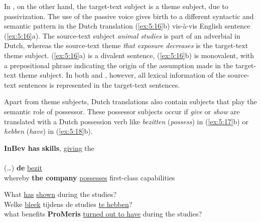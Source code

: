 \documentclass[output=paper]{LSP/langsci}
\begin{document}
In , on the other hand, the target-text subject is a theme subject, due to passivization. The use of the passive voice gives birth to a different syntactic and semantic pattern in the Dutch translation (\ref{ex:5:16}b) vis-à-vis English sentence (\ref{ex:5:16}a). The source-text subject \textit{animal studies} is part of an adverbial in Dutch, whereas the source-text theme \textit{that exposure decreases} is the target-text theme subject. (\ref{ex:5:16}a) is a divalent sentence, (\ref{ex:5:16}b) is monovalent, with a prepositional phrase indicating the origin of the assumption made in the target-text theme subject. In both  and , however, all lexical information of the source-text sentences is represented in the target-text sentences.    

Apart from theme subjects, Dutch translations also contain subjects that play the semantic role of possessor. These possessor subjects occur if \textit{give} or \textit{show} are translated with a Dutch possession verb like \textit{bezitten} (\textit{possess}) in (\ref{ex:5:17}b) or \textit{hebben} (\textit{have}) in (\ref{ex:5:18}b).  


\ea \label{ex:5:17}
\ea
\textbf{InBev has}  \textbf{skills}, \ul{giving} the \\ \,  \\[1em]
\ex
(\dots)  \textbf{de}   \ul{bezit}\\
whereby \textbf{the company} \ul{possesses} first-class capabilities
\z
\z


\ea \label{ex:5:18}
\ea What  \ul{has}  \ul{shown} during the studies?\\[1em]
\ex Welke  \ul{bleek}  tijdens de studies \ul{te hebben}?\\
what benefits \textbf{ProMeris} \ul{turned out to have} during the studies?
\z
\z


\end{document}
